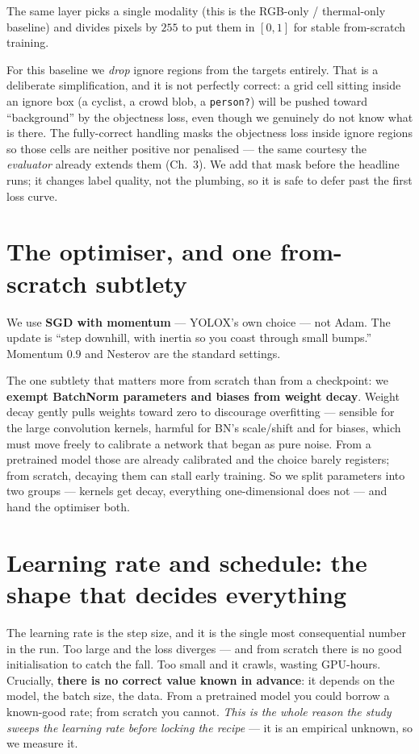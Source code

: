 \documentclass[../main.tex]{subfiles}
\begin{document}
The same layer picks a single modality (this is the RGB-only / thermal-only baseline) and divides
pixels by $255$ to put them in $[0,1]$ for stable from-scratch training.

\begin{lesson}
For this baseline we \emph{drop} ignore regions from the targets entirely. That is a deliberate
simplification, and it is not perfectly correct: a grid cell sitting inside an ignore box (a
cyclist, a crowd blob, a \texttt{person?}) will be pushed toward ``background'' by the objectness
loss, even though we genuinely do not know what is there. The fully-correct handling masks the
objectness loss inside ignore regions so those cells are neither positive nor penalised --- the
same courtesy the \emph{evaluator} already extends them (Ch.~3). We add that mask before the
headline runs; it changes label quality, not the plumbing, so it is safe to defer past the
first loss curve.
\end{lesson}

\section{The optimiser, and one from-scratch subtlety}

We use \textbf{SGD with momentum} --- YOLOX's own choice --- not Adam. The update is ``step
downhill, with inertia so you coast through small bumps.'' Momentum $0.9$ and Nesterov are the
standard settings.

The one subtlety that matters more from scratch than from a checkpoint: we \textbf{exempt
BatchNorm parameters and biases from weight decay}. Weight decay gently pulls weights toward zero to
discourage overfitting --- sensible for the large convolution kernels, harmful for BN's scale/shift
and for biases, which must move freely to calibrate a network that began as pure noise. From a
pretrained model those are already calibrated and the choice barely registers; from scratch,
decaying them can stall early training. So we split parameters into two groups --- kernels get
decay, everything one-dimensional does not --- and hand the optimiser both.

\section{Learning rate and schedule: the shape that decides everything}

The learning rate is the step size, and it is the single most consequential number in the run. Too
large and the loss diverges --- and from scratch there is no good initialisation to catch the fall.
Too small and it crawls, wasting GPU-hours. Crucially, \textbf{there is no correct value known in
advance}: it depends on the model, the batch size, the data. From a pretrained model you could
borrow a known-good rate; from scratch you cannot. \emph{This is the whole reason the study sweeps
the learning rate before locking the recipe} --- it is an empirical unknown, so we measure it.
\end{document}
